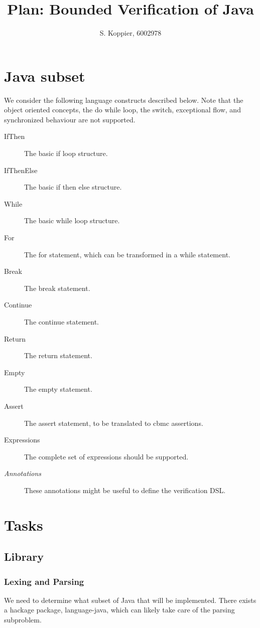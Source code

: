 \documentclass[a4paper]{article}
\begin{document}
\title{Plan: Bounded Verification of Java}
\author{S. Koppier, 6002978}
\maketitle

\section{Java subset}
We consider the following language constructs described below. Note that the 
object oriented concepts, the do while loop, the switch, exceptional flow, and 
synchronized behaviour are not supported.

\begin{description}
    \item [IfThen] The basic if loop structure.
    \item [IfThenElse] The basic if then else structure.
    \item [While] The basic while loop structure.
    \item [For] The for statement, which can be transformed in a while statement.
    \item [Break] The break statement.
    \item [Continue] The continue statement.
    \item [Return] The return statement.
    \item [Empty] The empty statement.
    \item [Assert] The assert statement, to be translated to cbmc assertions.
    \item [Expressions] The complete set of expressions should be supported.
    \item [\textit{Annotations}] These annotations might be useful to define the
    verification DSL.
\end{description}

\section{Tasks}
\subsection{Library} \label{sec:library}
\subsubsection{Lexing and Parsing}
We need to determine what subset of Java that will be implemented. There exists 
a hackage package, language-java, which can likely take care of the parsing
subproblem. 
\end{document}
